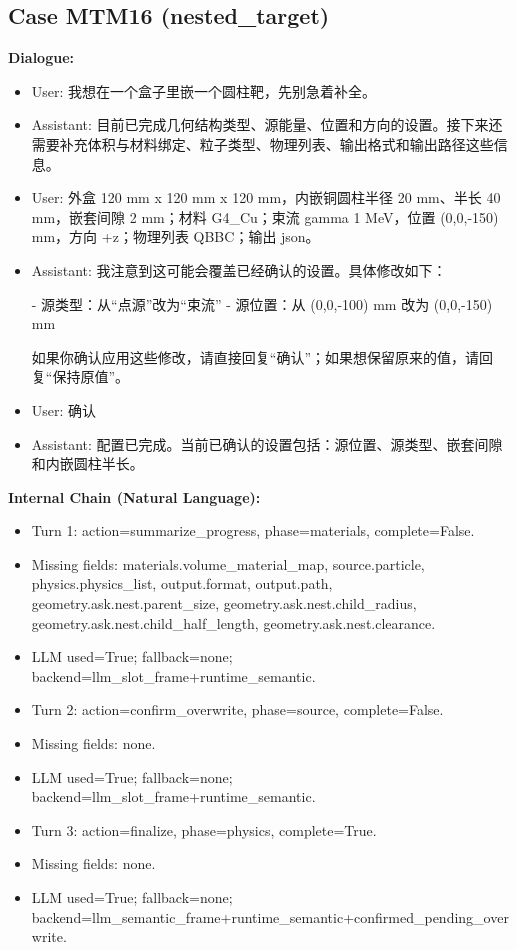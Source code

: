 \documentclass[11pt]{ctexart}
\begin{document}
\subsection{Case MTM16 (nested\_target)}
\textbf{Dialogue:}
\begin{itemize}
\item User: 我想在一个盒子里嵌一个圆柱靶，先别急着补全。
\item Assistant: 目前已完成几何结构类型、源能量、位置和方向的设置。接下来还需要补充体积与材料绑定、粒子类型、物理列表、输出格式和输出路径这些信息。
\item User: 外盒 120 mm x 120 mm x 120 mm，内嵌铜圆柱半径 20 mm、半长 40 mm，嵌套间隙 2 mm；材料 G4\_Cu；束流 gamma 1 MeV，位置 (0,0,-150) mm，方向 +z；物理列表 QBBC；输出 json。
\item Assistant: 我注意到这可能会覆盖已经确认的设置。具体修改如下：

- 源类型：从“点源”改为“束流”
- 源位置：从 (0,0,-100) mm 改为 (0,0,-150) mm

如果你确认应用这些修改，请直接回复“确认”；如果想保留原来的值，请回复“保持原值”。
\item User: 确认
\item Assistant: 配置已完成。当前已确认的设置包括：源位置、源类型、嵌套间隙和内嵌圆柱半长。
\end{itemize}
\textbf{Internal Chain (Natural Language):}
\begin{itemize}
\item Turn 1: action=summarize\_progress, phase=materials, complete=False.
\item Missing fields: materials.volume\_material\_map, source.particle, physics.physics\_list, output.format, output.path, geometry.ask.nest.parent\_size, geometry.ask.nest.child\_radius, geometry.ask.nest.child\_half\_length, geometry.ask.nest.clearance.
\item LLM used=True; fallback=none; backend=llm\_slot\_frame+runtime\_semantic.
\item Turn 2: action=confirm\_overwrite, phase=source, complete=False.
\item Missing fields: none.
\item LLM used=True; fallback=none; backend=llm\_slot\_frame+runtime\_semantic.
\item Turn 3: action=finalize, phase=physics, complete=True.
\item Missing fields: none.
\item LLM used=True; fallback=none; backend=llm\_semantic\_frame+runtime\_semantic+confirmed\_pending\_overwrite.
\end{itemize}
\end{document}
